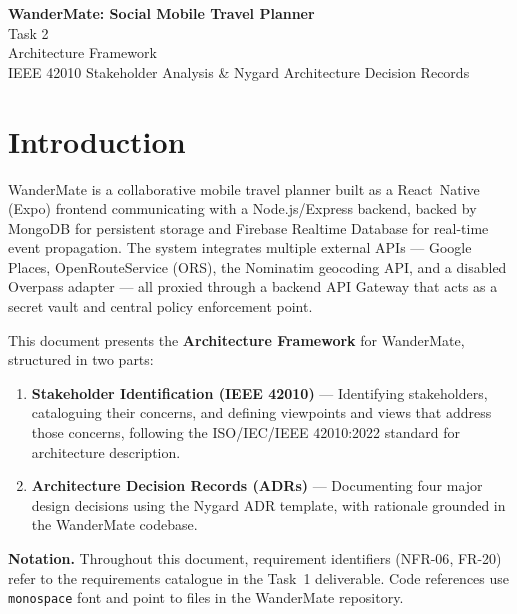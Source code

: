 \documentclass[12pt, a4paper]{article}
\newcommand{\code}[1]{\texttt{\small #1}}
\newcommand{\reqid}[1]{\textsc{\small #1}}
\begin{document}
\thispagestyle{empty}

\begin{center}
  {\LARGE\bfseries WanderMate: Social Mobile Travel Planner}\\[0.8em]
  {\large Task 2 }\\[0.4em]
  {\large Architecture Framework}\\[0.3em]
  {\normalsize IEEE 42010 Stakeholder Analysis \& Nygard Architecture Decision Records}
\end{center}

\tableofcontents
\newpage

\section{Introduction}

WanderMate is a collaborative mobile travel planner built as a React~Native (Expo) frontend communicating with a Node.js/Express backend, backed by MongoDB for persistent storage and Firebase Realtime Database for real-time event propagation. The system integrates multiple external APIs --- Google Places, OpenRouteService (ORS), the Nominatim geocoding API, and a disabled Overpass adapter --- all proxied through a backend API Gateway that acts as a secret vault and central policy enforcement point.

This document presents the \textbf{Architecture Framework} for WanderMate, structured in two parts:

\begin{enumerate}
  \item \textbf{Stakeholder Identification (IEEE 42010)} --- Identifying stakeholders, cataloguing their concerns, and defining viewpoints and views that address those concerns, following the ISO/IEC/IEEE 42010:2022 standard for architecture description.
  \item \textbf{Architecture Decision Records (ADRs)} --- Documenting four major design decisions using the Nygard ADR template, with rationale grounded in the WanderMate codebase.
\end{enumerate}

\begin{tcolorbox}[notebox]
  \textbf{Notation.} Throughout this document, requirement identifiers (\reqid{NFR-06}, \reqid{FR-20}) refer to the requirements catalogue in the Task~1 deliverable. Code references use \code{monospace} font and point to files in the WanderMate repository.
\end{tcolorbox}
\end{document}
